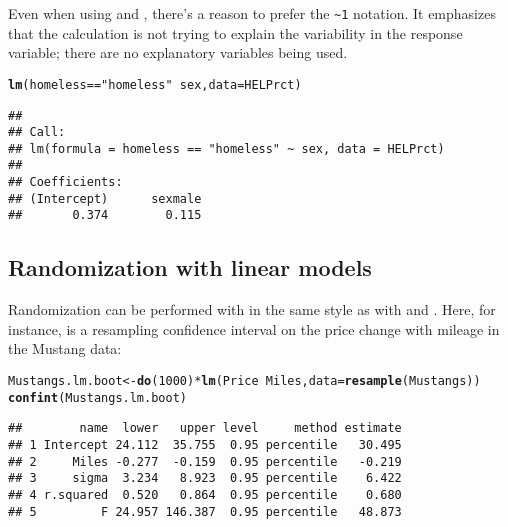 \documentclass[11pt]{article}\usepackage[]{graphicx}\usepackage[]{color}
\makeatletter
\newcommand{\hlnum}[1]{\textcolor[rgb]{0.686,0.059,0.569}{#1}}%
\newcommand{\hlstr}[1]{\textcolor[rgb]{0.192,0.494,0.8}{#1}}%
\newcommand{\hlopt}[1]{\textcolor[rgb]{0,0,0}{#1}}%
\newcommand{\hlstd}[1]{\textcolor[rgb]{0.345,0.345,0.345}{#1}}%
\newcommand{\hlkwb}[1]{\textcolor[rgb]{0.69,0.353,0.396}{#1}}%
\newcommand{\hlkwc}[1]{\textcolor[rgb]{0.333,0.667,0.333}{#1}}%
\newcommand{\hlkwd}[1]{\textcolor[rgb]{0.737,0.353,0.396}{\textbf{#1}}}%
\newenvironment{kframe}{%
 \def\at@end@of@kframe{}%
 \ifinner\ifhmode%
  \def\at@end@of@kframe{\end{minipage}}%
  \begin{minipage}{\columnwidth}%
 \fi\fi%
 \def\FrameCommand##1{\hskip\@totalleftmargin \hskip-\fboxsep
 \colorbox{shadecolor}{##1}\hskip-\fboxsep
     \hskip-\linewidth \hskip-\@totalleftmargin \hskip\columnwidth}%
 \MakeFramed {\advance\hsize-\width
   \@totalleftmargin\z@ \linewidth\hsize
   \@setminipage}}%
 {\par\unskip\endMakeFramed%
 \at@end@of@kframe}
\newenvironment{knitrout}{}{} %
\makeatother
\begin{document}
Even when using  and , there's a reason to prefer the \verb+~1+ notation.  It emphasizes that the calculation is not trying to explain the variability in the response variable; there are no explanatory variables being used.  


\begin{knitrout}
\color{fgcolor}\begin{kframe}
\begin{alltt}
\hlkwd{lm}\hlstd{(homeless}\hlopt{==}\hlstr{"homeless"} \hlopt{~} \hlstd{sex,} \hlkwc{data} \hlstd{= HELPrct)}
\end{alltt}
\begin{verbatim}
## 
## Call:
## lm(formula = homeless == "homeless" ~ sex, data = HELPrct)
## 
## Coefficients:
## (Intercept)      sexmale  
##       0.374        0.115
\end{verbatim}
\end{kframe}
\end{knitrout}

\subsection{Randomization with linear models}

Randomization can be performed with  in the same style as with  and .  Here, for instance, is a resampling confidence interval on the 
price change with mileage in the Mustang data:
\begin{knitrout}
\color{fgcolor}\begin{kframe}
\begin{alltt}
\hlstd{Mustangs.lm.boot} \hlkwb{<-} \hlkwd{do}\hlstd{(}\hlnum{1000}\hlstd{)} \hlopt{*} \hlkwd{lm}\hlstd{(Price} \hlopt{~} \hlstd{Miles,} \hlkwc{data} \hlstd{=} \hlkwd{resample}\hlstd{(Mustangs))}
\hlkwd{confint}\hlstd{(Mustangs.lm.boot)}
\end{alltt}
\begin{verbatim}
##        name  lower   upper level     method estimate
## 1 Intercept 24.112  35.755  0.95 percentile   30.495
## 2     Miles -0.277  -0.159  0.95 percentile   -0.219
## 3     sigma  3.234   8.923  0.95 percentile    6.422
## 4 r.squared  0.520   0.864  0.95 percentile    0.680
## 5         F 24.957 146.387  0.95 percentile   48.873
\end{verbatim}
\end{kframe}
\end{knitrout}
\end{document}
